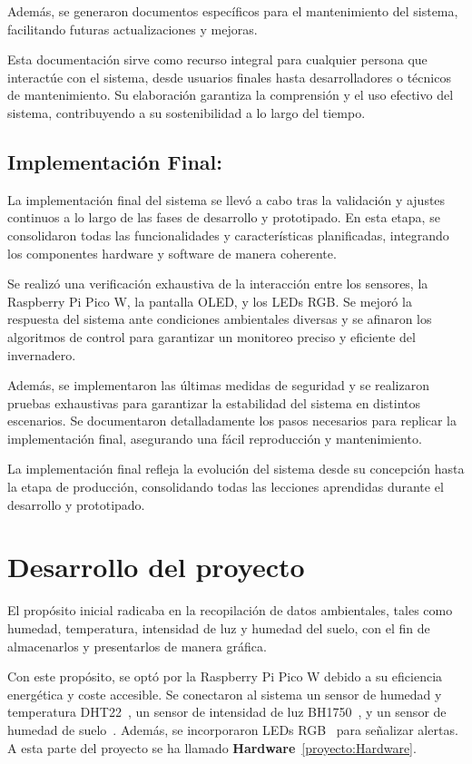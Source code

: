 Además, se generaron documentos específicos para el mantenimiento del sistema, facilitando futuras actualizaciones y mejoras.

Esta documentación sirve como recurso integral para cualquier persona que interactúe con el sistema, desde usuarios finales hasta desarrolladores o técnicos de mantenimiento. Su elaboración garantiza la comprensión y el uso efectivo del sistema, contribuyendo a su sostenibilidad a lo largo del tiempo.

\subsection{Implementación Final:}
La implementación final del sistema se llevó a cabo tras la validación y ajustes continuos a lo largo de las fases de desarrollo y prototipado. En esta etapa, se consolidaron todas las funcionalidades y características planificadas, integrando los componentes hardware y software de manera coherente.

Se realizó una verificación exhaustiva de la interacción entre los sensores, la Raspberry Pi Pico W, la pantalla OLED, y los LEDs RGB. Se mejoró la respuesta del sistema ante condiciones ambientales diversas y se afinaron los algoritmos de control para garantizar un monitoreo preciso y eficiente del invernadero.

Además, se implementaron las últimas medidas de seguridad y se realizaron pruebas exhaustivas para garantizar la estabilidad del sistema en distintos escenarios. Se documentaron detalladamente los pasos necesarios para replicar la implementación final, asegurando una fácil reproducción y mantenimiento.

La implementación final refleja la evolución del sistema desde su concepción hasta la etapa de producción, consolidando todas las lecciones aprendidas durante el desarrollo y prototipado.

\section{Desarrollo del proyecto}

El propósito inicial radicaba en la recopilación de datos ambientales, tales como humedad, temperatura, intensidad de luz y humedad del suelo, con el fin de almacenarlos y presentarlos de manera gráfica.

Con este propósito, se optó por la Raspberry Pi Pico W debido a su eficiencia energética y coste accesible. Se conectaron al sistema un sensor de humedad y temperatura DHT22~\cite{manual:DHT22}, un sensor de intensidad de luz BH1750~\cite{manual:BH1750}, y un sensor de humedad de suelo~\cite{wiki:SensorHumedadSuelo}. Además, se incorporaron LEDs RGB~\cite{manual:LedRGB} para señalizar alertas. A esta parte del proyecto se ha llamado \textbf{Hardware}~\ref{proyecto:Hardware}.

